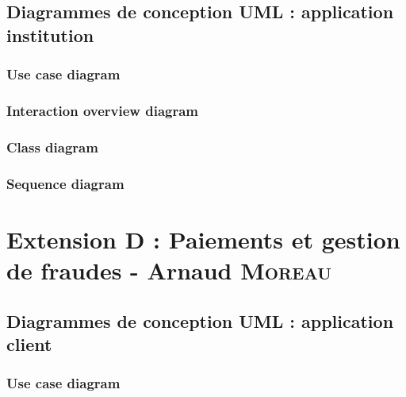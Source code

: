 \documentclass[]{report}
\begin{document}
\newpage



\section{Diagrammes de conception UML : application institution}



\subsection{Use case diagram}

\newpage

\subsection{Interaction overview diagram}

\newpage

\subsection{Class diagram}

\newpage

\subsection{Sequence diagram}

\newpage





\chapter{Extension D : Paiements et gestion de fraudes - Arnaud \textsc{Moreau}}





\newpage




\section{Diagrammes de conception UML : application client}




\subsection{Use case diagram}
\end{document}
